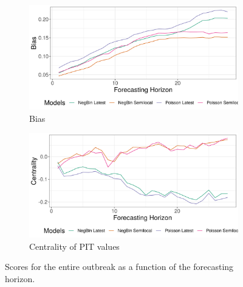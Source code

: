 \begin{figure}[H]
\begin{subfigure}{0.5\textwidth}
  \centering
  \includegraphics[width=\linewidth]{../output/Butembo_bias.png}  
  \caption{Bias}
  \label{fig:sub-third}
\end{subfigure}
\begin{subfigure}{0.5\textwidth}
  \centering
  \includegraphics[width=\linewidth]{../output/Butembo_centrality.png}  
  \caption{Centrality of PIT values}
  \label{fig:nat_scores_4}
\end{subfigure}
  \caption{Scores for the entire outbreak as a function of the forecasting horizon.}

  \label{fig:nat_scores}
\end{figure}
